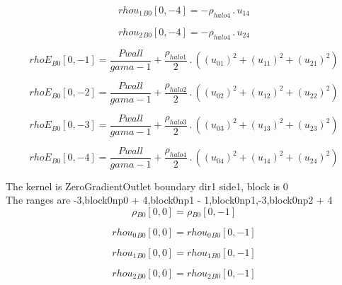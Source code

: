 \documentclass{article}
\begin{document}
\begin{dmath}{rhou_{1}{_{B0}}}[{0,-4}] = - \rho_{halo 4} \,.\, u_{14}\end{dmath}

\begin{dmath}{rhou_{2}{_{B0}}}[{0,-4}] = - \rho_{halo 4} \,.\, u_{24}\end{dmath}

\begin{dmath}{rhoE{_{B0}}}[{0,-1}] = \frac{Pwall}{gama - 1} + \frac{\rho_{halo 1}}{2} \,.\, \left(\left(u_{01} \right)^{2} + \left(u_{11} \right)^{2} + \left(u_{21} \right)^{2}\right)\end{dmath}

\begin{dmath}{rhoE{_{B0}}}[{0,-2}] = \frac{Pwall}{gama - 1} + \frac{\rho_{halo 2}}{2} \,.\, \left(\left(u_{02} \right)^{2} + \left(u_{12} \right)^{2} + \left(u_{22} \right)^{2}\right)\end{dmath}

\begin{dmath}{rhoE{_{B0}}}[{0,-3}] = \frac{Pwall}{gama - 1} + \frac{\rho_{halo 3}}{2} \,.\, \left(\left(u_{03} \right)^{2} + \left(u_{13} \right)^{2} + \left(u_{23} \right)^{2}\right)\end{dmath}

\begin{dmath}{rhoE{_{B0}}}[{0,-4}] = \frac{Pwall}{gama - 1} + \frac{\rho_{halo 4}}{2} \,.\, \left(\left(u_{04} \right)^{2} + \left(u_{14} \right)^{2} + \left(u_{24} \right)^{2}\right)\end{dmath}

\noindent The kernel is ZeroGradientOutlet boundary dir1 side1, block is 0\\\noindent The ranges are -3,block0np0 + 4,block0np1 - 1,block0np1,-3,block0np2 + 4\\\begin{dmath}{\rho{_{B0}}}[{0,0}] = {\rho{_{B0}}}[{0,-1}]\end{dmath}

\begin{dmath}{rhou_{0}{_{B0}}}[{0,0}] = {rhou_{0}{_{B0}}}[{0,-1}]\end{dmath}

\begin{dmath}{rhou_{1}{_{B0}}}[{0,0}] = {rhou_{1}{_{B0}}}[{0,-1}]\end{dmath}

\begin{dmath}{rhou_{2}{_{B0}}}[{0,0}] = {rhou_{2}{_{B0}}}[{0,-1}]\end{dmath}
\end{document}
